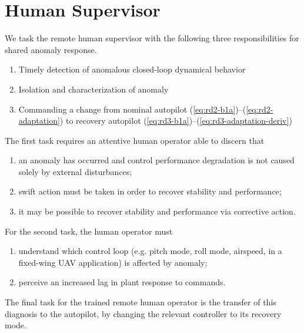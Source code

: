 \section{Human Supervisor}\label{subsec:sc_human}
We task the remote human supervisor with the following three responsibilities for shared anomaly response.
\begin{enumerate}[label=\textbf{Task \arabic*.}, leftmargin=1.8cm]
	\item Timely detection of anomalous closed-loop dynamical behavior
	\item Isolation and characterization of anomaly
	\item Commanding a change from nominal autopilot (\ref{eq:rd2-b1a})--(\ref{eq:rd2-adaptation}) to recovery autopilot (\ref{eq:rd3-b1a})--(\ref{eq:rd3-adaptation-deriv})
\end{enumerate}
The first task requires an attentive human operator able to discern that 
\begin{enumerate}[label=(\alph*)]
	\item an anomaly has occurred and control performance degradation is not caused solely by external disturbances;
	\item swift action must be taken in order to recover stability and performance;
	\item it may be possible to recover stability and performance via corrective action.
\end{enumerate}	
For the second task, the human operator must
\begin{enumerate}[label=(\alph*)]
	\item understand which control loop (e.g. pitch mode, roll mode, airspeed, in a fixed-wing UAV application) is affected by anomaly;
	\item perceive an increased lag in plant response to commands.
\end{enumerate}
The final task for the trained remote human operator is the transfer of this diagnosis to the autopilot, by changing the relevant controller to its recovery mode.


